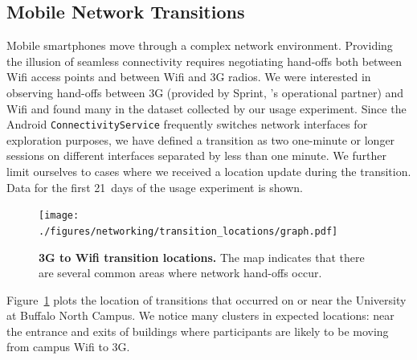 \subsection{Mobile Network Transitions}
\label{subsec-networktransitions}

Mobile smartphones move through a complex network environment. Providing the
illusion of seamless connectivity requires negotiating hand-offs both between
Wifi access points and between Wifi and 3G radios. We were interested in
observing hand-offs between 3G (provided by Sprint, \PhoneLab{}'s operational
partner) and Wifi and found many in the dataset collected by our usage
experiment. Since the Android \texttt{ConnectivityService} frequently
switches network interfaces for exploration purposes, we have defined a
transition as two one-minute or longer sessions on different interfaces
separated by less than one minute. We further limit ourselves to cases where
we received a location update during the transition. Data for the first
21~days of the usage experiment is shown.

\begin{figure}[t]

\centering
\texttt{[image: ./figures/networking/transition\_locations/graph.pdf]}

\caption{\textbf{3G to Wifi transition locations.} The map indicates that
there are several common areas where network hand-offs occur.}

\label{figure-networktransitions}

\end{figure}

Figure~\ref{figure-networktransitions} plots the location of transitions that
occurred on or near the University at Buffalo North Campus. We notice many
clusters in expected locations: near the entrance and exits of buildings
where participants are likely to be moving from campus Wifi to 3G.
